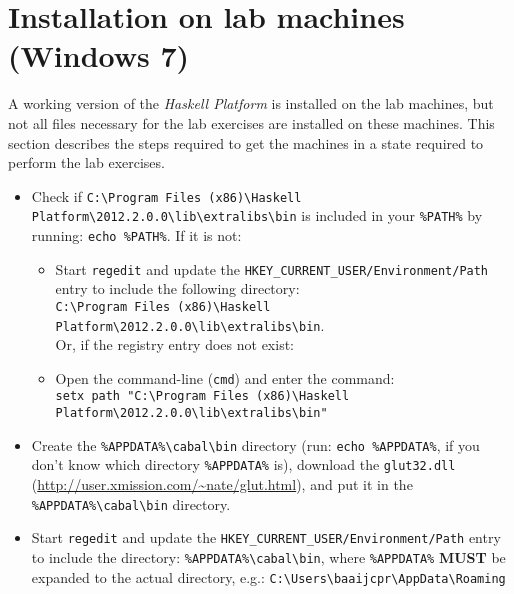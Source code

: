 \documentclass[]{article}
\begin{document}
\section{Installation on lab machines (Windows 7)}
A working version of the \emph{Haskell Platform} is installed on the lab machines, but not all files necessary for the lab exercises are installed on these machines.
This section describes the steps required to get the machines in a state required to perform the lab exercises.

\begin{itemize}
  \item Check if \texttt{C:\textbackslash{}Program Files (x86)\textbackslash{}Haskell Platform\textbackslash{}2012.2.0.0\textbackslash{}lib\textbackslash{}extralibs\textbackslash{}bin} is included in your \texttt{\%PATH\%} by running: \texttt{echo \%PATH\%}.
  If it is not:
  \begin{itemize}
    \item Start \texttt{regedit} and update the \texttt{HKEY\_CURRENT\_USER/Environment/Path} entry to include the following directory:\\ \texttt{C:\textbackslash{}Program Files (x86)\textbackslash{}Haskell Platform\textbackslash{}2012.2.0.0\textbackslash{}lib\textbackslash{}extralibs\textbackslash{}bin}.\\ Or, if the registry entry does not exist:
    \item Open the command-line (\texttt{cmd}) and enter the command:\\
    \texttt{setx path "C:\textbackslash{}Program Files (x86)\textbackslash{}Haskell Platform\textbackslash{}2012.2.0.0\textbackslash{}lib\textbackslash{}extralibs\textbackslash{}bin"}
  \end{itemize}
  \item Create the \texttt{\%APPDATA\%\textbackslash{}cabal\textbackslash{}bin} directory (run: \texttt{echo \%APPDATA\%}, if you don't know which directory \texttt{\%APPDATA\%} is), download the \texttt{glut32.dll} (\url{http://user.xmission.com/~nate/glut.html}), and put it in the \texttt{\%APPDATA\%\textbackslash{}cabal\textbackslash{}bin} directory.
  \item Start \texttt{regedit} and update the \texttt{HKEY\_CURRENT\_USER/Environment/Path} entry to include the directory: \texttt{\%APPDATA\%\textbackslash{}cabal\textbackslash{}bin}, where \texttt{\%APPDATA\%} \textbf{MUST} be expanded to the actual directory, e.g.: \texttt{C:\textbackslash{}Users\textbackslash{}baaijcpr\textbackslash{}AppData\textbackslash{}Roaming}

\end{itemize}
\end{document}

